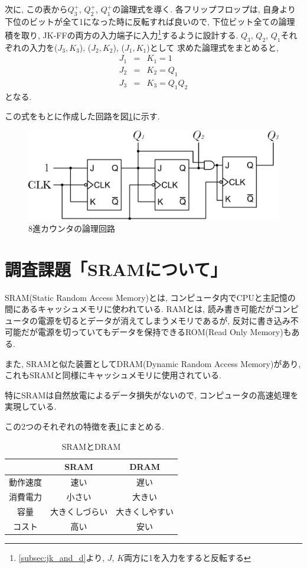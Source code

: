 \documentclass[titlepage]{jsarticle}
\begin{document}
    次に, この表から$Q_3^+$, $Q_2^+$, $Q_1^+$の論理式を導く.
    各フリップフロップは, 自身より下位のビットが全て1になった時に反転すれば良いので,
    下位ビット全ての論理積を取り,
    JK-FFの両方の入力端子に入力\footnote{\ref{subsec:jk_and_d}より,
    $J$, $K$両方に1を入力をすると反転する}するように設計する.
    $Q_3$, $Q_2$, $Q_1$それぞれの入力を($J_3, K_3$), ($J_2, K_2$), ($J_1, K_1$)として
    求めた論理式をまとめると,
    \begin{eqnarray*}
      J_1 &=& K_1 = 1 \\
      J_2 &=& K_2 = Q_1 \\
      J_3 &=& K_3 = Q_1Q_2
    \end{eqnarray*}
    となる.

    この式をもとに作成した回路を図\ref{fig:counter}に示す.
    \begin{figure}[h]
      \centering
      \includegraphics[width=13cm]{images/counter.pdf}
      \caption{8進カウンタの論理回路}
      \label{fig:counter}
    \end{figure}
\section{調査課題「SRAMについて」}
  SRAM(Static Random Access Memory)とは, コンピュータ内でCPUと主記憶の間にあるキャッシュメモリに使われている.
  RAMとは, 読み書き可能だがコンピュータの電源を切るとデータが消えてしまうメモリであるが,
  反対に書き込み不可能だが電源を切っていてもデータを保持できるROM(Read Only Memory)もある.

  また, SRAMと似た装置としてDRAM(Dynamic Random Access Memory)があり,
  これもSRAMと同様にキャッシュメモリに使用されている.

  特にSRAMは自然放電によるデータ損失がないので,
  コンピュータの高速処理を実現している.

  この2つのそれぞれの特徴を表\ref{tab:SRAM_and_DRAM}にまとめる.

  \begin{table}[h]
    \centering
    \caption{SRAMとDRAM}
    \label{tab:SRAM_and_DRAM}
    \begin{tabular}{c|cc}
      & SRAM & DRAM \\ \hline
      動作速度 & 速い & 遅い \\
      消費電力 & 小さい & 大きい \\
      容量 & 大きくしづらい & 大きくしやすい \\
      コスト & 高い & 安い \\
    \end{tabular}
  \end{table}
\end{document}
